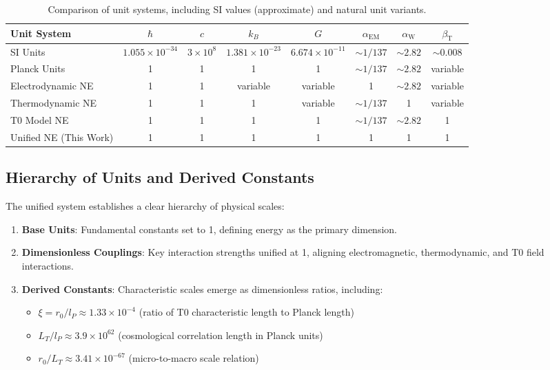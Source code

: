 \documentclass[12pt,a4paper]{article} %
\newcommand{\alphaEM}{\alpha_{\text{EM}}}
\newcommand{\alphaW}{\alpha_{\text{W}}}
\newcommand{\betaT}{\beta_{\text{T}}}
\begin{document}
	\begin{table}[ht]
		\centering
		\caption{Comparison of unit systems,
			including SI values (approximate) and natural unit variants.}
		\label{tab:unit_comparison}
		\begin{tabular}{lccccccc} %
			\hline
			\textbf{Unit System} & $\hbar$ & $c$ & $k_B$ & $G$ & $\alphaEM$ & $\alphaW$ & $\betaT$ \\
			\hline
			SI Units & $1.055 \times 10^{-34}$ & $3 \times 10^8$ & $1.381 \times 10^{-23}$ & $6.674 \times 10^{-11}$ & $\sim 1/137$ & $\sim 2.82$ & $\sim 0.008$ \\
			Planck Units & 1 & 1 & 1 & 1 & $\sim 1/137$ & $\sim 2.82$ & variable \\
			Electrodynamic NE & 1 & 1 & variable & variable & 1 & $\sim 2.82$ & variable \\
			Thermodynamic NE & 1 & 1 & 1 & variable & $\sim 1/137$ & 1 & variable \\
			T0 Model NE & 1 & 1 & 1 & 1 & $\sim 1/137$ & $\sim 2.82$ & 1 \\
			Unified NE (This Work) & 1 & 1 & 1 & 1 & 1 & 1 & 1 \\
			\hline
		\end{tabular}
	\end{table}
	
	\subsection{Hierarchy of Units and Derived Constants}
	\label{subsec:hierarchy}
	
	The unified system establishes a clear hierarchy of physical scales:
	\begin{enumerate}
		\item \textbf{Base Units}:
		Fundamental constants set to 1,
		defining energy as the primary dimension.
		\item \textbf{Dimensionless Couplings}:
		Key interaction strengths unified at 1,
		aligning electromagnetic, thermodynamic, and T0 field interactions.
		\item \textbf{Derived Constants}:
		Characteristic scales emerge as dimensionless ratios,
		including:
		\begin{itemize}
			\item $\xi = r_0/l_P \approx 1.33 \times 10^{-4}$
			(ratio of T0 characteristic length to Planck length)
			\item $L_T/l_P \approx 3.9 \times 10^{62}$
			(cosmological correlation length in Planck units)
			\item $r_0/L_T \approx 3.41 \times 10^{-67}$
			(micro-to-macro scale relation)
		\end{itemize}
	\end{enumerate}
	
\end{document}
